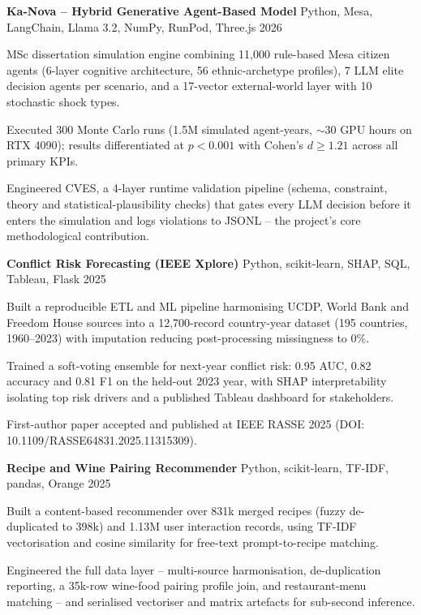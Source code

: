 \documentclass[letterpaper,10pt]{article}
\newcommand{\project}[3]{%
  \textbf{#1} \textbar{} #2 \hfill #3\\[1pt]
}
\begin{document}
\project{Ka-Nova -- Hybrid Generative Agent-Based Model}{Python, Mesa, LangChain, Llama 3.2, NumPy, RunPod, Three.js}{2026}
\begin{tight}
  \item MSc dissertation simulation engine combining 11,000 rule-based Mesa citizen agents
  (6-layer cognitive architecture, 56 ethnic-archetype profiles), 7 LLM elite decision
  agents per scenario, and a 17-vector external-world layer with 10 stochastic shock types.
  \item Executed 300 Monte Carlo runs (1.5M simulated agent-years, $\sim$30 GPU hours on RTX
  4090); results differentiated at $p<0.001$ with Cohen's $d \geq 1.21$ across all primary KPIs.
  \item Engineered CVES, a 4-layer runtime validation pipeline (schema, constraint, theory
  and statistical-plausibility checks) that gates every LLM decision before it enters the
  simulation and logs violations to JSONL -- the project's core methodological contribution.
\end{tight}

\vspace{3pt}
\project{Conflict Risk Forecasting (IEEE Xplore)}{Python, scikit-learn, SHAP, SQL, Tableau, Flask}{2025}
\begin{tight}
  \item Built a reproducible ETL and ML pipeline harmonising UCDP, World Bank and Freedom
  House sources into a 12,700-record country-year dataset (195 countries, 1960--2023) with
  imputation reducing post-processing missingness to 0\%.
  \item Trained a soft-voting ensemble for next-year conflict risk: 0.95 AUC, 0.82 accuracy
  and 0.81 F1 on the held-out 2023 year, with SHAP interpretability isolating top risk
  drivers and a published Tableau dashboard for stakeholders.
  \item First-author paper accepted and published at IEEE RASSE 2025 (DOI:
  10.1109/RASSE64831.2025.11315309).
\end{tight}

\vspace{3pt}
\project{Recipe and Wine Pairing Recommender}{Python, scikit-learn, TF-IDF, pandas, Orange}{2025}
\begin{tight}
  \item Built a content-based recommender over 831k merged recipes (fuzzy de-duplicated to
  398k) and 1.13M user interaction records, using TF-IDF vectorisation and cosine similarity
  for free-text prompt-to-recipe matching.
  \item Engineered the full data layer -- multi-source harmonisation, de-duplication
  reporting, a 35k-row wine-food pairing profile join, and restaurant-menu matching -- and
  serialised vectoriser and matrix artefacts for sub-second inference.
\end{tight}
\end{document}
